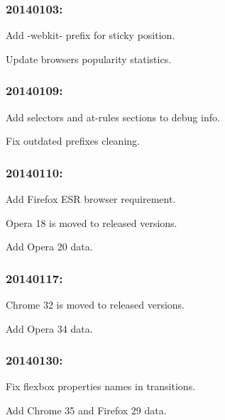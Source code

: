 \subsubsection*{20140103\+:}


\begin{DoxyItemize}
\item Add {\ttfamily -\/webkit-\/} prefix for {\ttfamily sticky} position.
\item Update browsers popularity statistics.
\end{DoxyItemize}

\subsubsection*{20140109\+:}


\begin{DoxyItemize}
\item Add selectors and at-\/rules sections to debug info.
\item Fix outdated prefixes cleaning.
\end{DoxyItemize}

\subsubsection*{20140110\+:}


\begin{DoxyItemize}
\item Add {\ttfamily Firefox E\+SR} browser requirement.
\item Opera 18 is moved to released versions.
\item Add Opera 20 data.
\end{DoxyItemize}

\subsubsection*{20140117\+:}


\begin{DoxyItemize}
\item Chrome 32 is moved to released versions.
\item Add Opera 34 data.
\end{DoxyItemize}

\subsubsection*{20140130\+:}


\begin{DoxyItemize}
\item Fix flexbox properties names in transitions.
\item Add Chrome 35 and Firefox 29 data.
\end{DoxyItemize}

